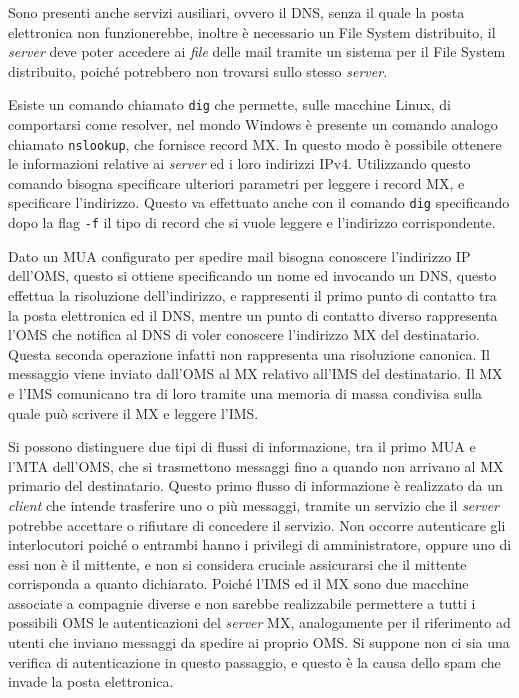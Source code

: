 \documentclass{article}
\numberwithin{equation}{subsection}
\begin{document}
Sono presenti anche servizi ausiliari, ovvero il \textcolor{Mahogany}{DNS}, senza il quale la posta elettronica non funzionerebbe, inoltre è necessario un File System distribuito, il \textit{server} deve poter accedere ai \textit{file} delle mail tramite un sistema per il File System distribuito, poiché potrebbero non trovarsi sullo stesso \textit{server}. 

Esiste un comando chiamato \verb|dig| che permette, sulle macchine Linux, di comportarsi come resolver, nel mondo Windows è presente un comando analogo chiamato \verb|nslookup|, che fornisce record MX. In questo modo è possibile ottenere le informazioni relative ai \textit{server} ed i loro indirizzi \textcolor{BurntOrange}{IPv4}. Utilizzando questo comando bisogna specificare ulteriori parametri per leggere i record MX, e specificare l'indirizzo. Questo va effettuato anche con il comando \verb|dig| specificando dopo la flag \verb|-f| il tipo di record che si vuole leggere e l'indirizzo corrispondente. 


Dato un MUA configurato per spedire mail bisogna conoscere l'indirizzo \textcolor{Bittersweet}{IP} dell'OMS, questo si ottiene specificando un nome ed invocando un \textcolor{Mahogany}{DNS}, questo effettua la risoluzione dell'indirizzo, e rappresenti il primo punto di contatto tra la posta elettronica ed il \textcolor{Mahogany}{DNS}, mentre un punto di contatto diverso rappresenta l'OMS che notifica al \textcolor{Mahogany}{DNS} di voler conoscere l'indirizzo MX del destinatario. Questa seconda operazione infatti non rappresenta una risoluzione canonica. Il messaggio viene inviato dall'OMS al MX relativo all'IMS del destinatario. 
Il MX e l'IMS comunicano tra di loro tramite una memoria di massa condivisa sulla quale può scrivere il MX e leggere l'IMS. 


Si possono distinguere due tipi di flussi di informazione, tra il primo MUA e l'MTA dell'OMS, che si trasmettono messaggi fino a quando non arrivano al MX primario del destinatario. 
Questo primo flusso di informazione è realizzato da un \textit{client} che intende trasferire uno o più messaggi, tramite un servizio che il \textit{server} potrebbe accettare o rifiutare di concedere il servizio. 
Non occorre autenticare gli interlocutori poiché o entrambi hanno i privilegi di amministratore, oppure uno di essi non è il mittente, e non si considera cruciale assicurarsi che il mittente corrisponda a quanto dichiarato. Poiché l'IMS ed il MX sono due macchine associate a compagnie diverse e non sarebbe realizzabile permettere a tutti i possibili OMS le autenticazioni del \textit{server} MX, analogamente per il riferimento ad utenti che inviano messaggi da spedire ai proprio OMS. 
Si suppone non ci sia una verifica di autenticazione in questo passaggio, e questo è la causa dello spam che invade la posta elettronica. 
\end{document}
